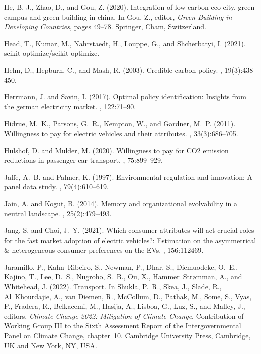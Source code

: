 \documentclass[12pt]{article}
\begin{document}
\begin{thebibliography}{}
He, B.-J., Zhao, D., and Gou, Z. (2020).
\newblock Integration of low-carbon eco-city, green campus and green building
  in china.
\newblock In Gou, Z., editor, {\em Green Building in Developing Countries},
  pages 49--78. Springer, Cham, Switzerland.

Head, T., Kumar, M., Nahrstaedt, H., Louppe, G., and Shcherbatyi, I. (2021).
\newblock scikit-optimize/scikit-optimize.

Helm, D., Hepburn, C., and Mash, R. (2003).
\newblock Credible carbon policy.
, 19(3):438--450.

Herrmann, J. and Savin, I. (2017).
\newblock Optimal policy identification: Insights from the german electricity
  market.
, 122:71--90.

Hidrue, M.~K., Parsons, G.~R., Kempton, W., and Gardner, M.~P. (2011).
\newblock Willingness to pay for electric vehicles and their attributes.
, 33(3):686--705.

Hulshof, D. and Mulder, M. (2020).
\newblock Willingness to pay for {CO2} emission reductions in passenger car
  transport.
, 75:899--929.

Jaffe, A.~B. and Palmer, K. (1997).
\newblock Environmental regulation and innovation: A panel data study.
, 79(4):610--619.

Jain, A. and Kogut, B. (2014).
\newblock Memory and organizational evolvability in a neutral landscape.
, 25(2):479--493.

Jang, S. and Choi, J.~Y. (2021).
\newblock Which consumer attributes will act crucial roles for the fast market
  adoption of electric vehicles?: {Estimation} on the asymmetrical \&
  heterogeneous consumer preferences on the {EVs}.
, 156:112469.

Jaramillo, P., Kahn~Ribeiro, S., Newman, P., Dhar, S., Diemuodeke, O.~E.,
  Kajino, T., Lee, D.~S., Nugroho, S.~B., Ou, X., Hammer~Strømman, A., and
  Whitehead, J. (2022).
\newblock Transport.
\newblock In Shukla, P.~R., Skea, J., Slade, R., Al~Khourdajie, A., van Diemen,
  R., McCollum, D., Pathak, M., Some, S., Vyas, P., Fradera, R., Belkacemi, M.,
  Hasija, A., Lisboa, G., Luz, S., and Malley, J., editors, {\em Climate Change
  2022: Mitigation of Climate Change}, Contribution of Working Group III to the
  Sixth Assessment Report of the Intergovernmental Panel on Climate Change,
  chapter~10. Cambridge University Press, Cambridge, UK and New York, NY, USA.


\end{thebibliography}
\end{document}
